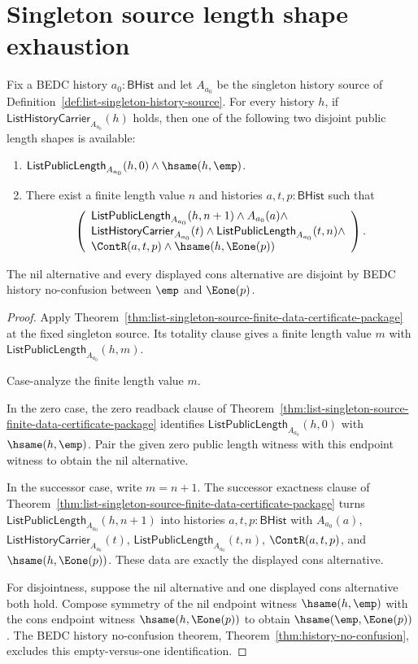 \section{Singleton source length shape exhaustion}
\label{sec:list-singleton-source-length-shape-exhaustion}

\begin{theorem}
\label{thm:list-singleton-source-public-length-shape-exhaustion}
Fix a BEDC history $a_0:\mathsf{BHist}$ and let $A_{a_0}$ be the singleton
history source of Definition~\ref{def:list-singleton-history-source}. For every
history $h$, if $\mathsf{ListHistoryCarrier}_{A_{a_0}}(h)$ holds, then one of
the following two disjoint public length shapes is available:
\begin{enumerate}
  \item $\mathsf{ListPublicLength}_{A_{a_0}}(h,0)\land \hsame(h,\emp)$.
  \item There exist a finite length value $n$ and histories
  $a,t,p:\mathsf{BHist}$ such that
  $$
  \left(
  \begin{array}{l}
  \mathsf{ListPublicLength}_{A_{a_0}}(h,n+1)\land
  A_{a_0}(a)\land\\
  \mathsf{ListHistoryCarrier}_{A_{a_0}}(t)\land
  \mathsf{ListPublicLength}_{A_{a_0}}(t,n)\land\\
  \ContR(a,t,p)\land \hsame(h,\Eone(p))
  \end{array}
  \right).
  $$
\end{enumerate}
The nil alternative and every displayed cons alternative are disjoint by BEDC
history no-confusion between $\emp$ and $\Eone(p)$.
\end{theorem}
\begin{proof}
Apply Theorem~\ref{thm:list-singleton-source-finite-data-certificate-package}
at the fixed singleton source. Its totality clause gives a finite length value
$m$ with $\mathsf{ListPublicLength}_{A_{a_0}}(h,m)$.

Case-analyze the finite length value $m$.

In the zero case, the zero readback clause of
Theorem~\ref{thm:list-singleton-source-finite-data-certificate-package}
identifies $\mathsf{ListPublicLength}_{A_{a_0}}(h,0)$ with
$\hsame(h,\emp)$. Pair the given zero public length witness with this endpoint
witness to obtain the nil alternative.

In the successor case, write $m=n+1$. The successor exactness clause of
Theorem~\ref{thm:list-singleton-source-finite-data-certificate-package}
turns $\mathsf{ListPublicLength}_{A_{a_0}}(h,n+1)$ into histories
$a,t,p:\mathsf{BHist}$ with $A_{a_0}(a)$,
$\mathsf{ListHistoryCarrier}_{A_{a_0}}(t)$,
$\mathsf{ListPublicLength}_{A_{a_0}}(t,n)$, $\ContR(a,t,p)$, and
$\hsame(h,\Eone(p))$. These data are exactly the displayed cons alternative.

For disjointness, suppose the nil alternative and one displayed cons
alternative both hold. Compose symmetry of the nil endpoint witness
$\hsame(h,\emp)$ with the cons endpoint witness $\hsame(h,\Eone(p))$ to obtain
$\hsame(\emp,\Eone(p))$. The BEDC history no-confusion theorem,
Theorem~\ref{thm:history-no-confusion}, excludes this empty-versus-one
identification.
\end{proof}
